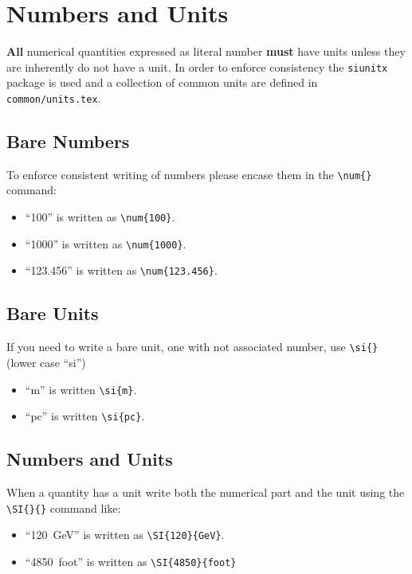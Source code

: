 \section{Numbers and Units}

\textbf{All} numerical quantities expressed as literal number
\textbf{must} have units unless they are inherently do not have a unit.
In order to enforce consistency the \texttt{siunitx} package is used
and a collection of common units are defined in
\texttt{common/units.tex}.

\subsection{Bare Numbers}

To enforce consistent writing of numbers please encase them in the
\verb|\num{}| command:

\begin{itemize}
\item ``\num{100}'' is written as \verb|\num{100}|.
\item ``\num{1000}'' is written as \verb|\num{1000}|.
\item ``\num{123.456}'' is written as \verb|\num{123.456}|.
\end{itemize}

\subsection{Bare Units}

If you need to write a bare unit, one with not associated number, use
\verb|\si{}| (lower case ``si'')

\begin{itemize}
\item ``\si{m}'' is written \verb|\si{m}|.
\item ``\si{pc}'' is written \verb|\si{pc}|.
\end{itemize}

\subsection{Numbers and Units}

When a quantity has a unit write both the numerical part and the unit
using the \verb|\SI{}{}| command like:

\begin{itemize}
\item ``\SI{120}{GeV}'' is written as \verb|\SI{120}{GeV}|.
\item ``\SI{4850}{foot}'' is written as \verb|\SI{4850}{foot}|
\end{itemize}

